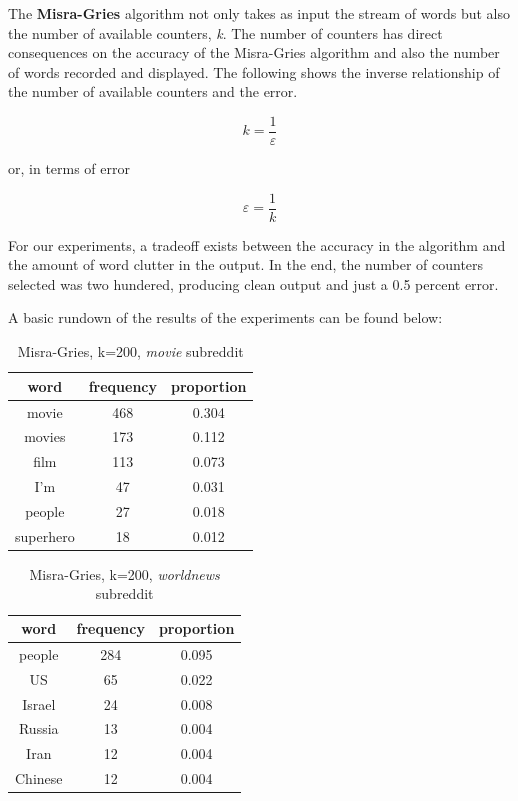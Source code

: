 \documentclass[12pt]{article}
\numberwithin{equation}{section}
\begin{document}
\raggedright

The \textbf{Misra-Gries} algorithm not only takes as input the stream of words but also the number of available counters, \textit{k}.  The number of counters has direct consequences on the accuracy of the Misra-Gries algorithm and also the number of words recorded and displayed.  The following shows the inverse relationship of the number of available counters and the error.    

\[k=\frac { 1 }{ \varepsilon  } \]  

or, in terms of error 

\[\varepsilon =\frac { 1 }{ k  } \]

For our experiments, a tradeoff exists between the accuracy in the algorithm and the amount of word clutter in the output.  In the end, the number of counters selected was two hundered, producing clean output and just a 0.5 percent error.

A basic rundown of the results of the experiments can be found below:

\begin{table}
\centering

\caption{Misra-Gries, k=200, \textit{movie} subreddit}
\begin{tabular}{c|c|c}
\hline
\textbf{word} & \textbf{frequency} & \textbf{proportion}\\
\hline
movie & 468 & 0.304\\
\hline
movies & 173 & 0.112\\
\hline
film & 113 & 0.073\\
\hline
I'm & 47 & 0.031\\
\hline
people & 27 & 0.018\\
\hline
superhero & 18 & 0.012\\
\hline
\end{tabular}
\end{table}

\begin{table}
\centering

\caption{Misra-Gries, k=200, \textit{worldnews} subreddit}
\begin{tabular}{c|c|c}
\hline
\textbf{word} & \textbf{frequency} & \textbf{proportion}\\
\hline
people & 284 & 0.095\\
\hline
US & 65 & 0.022\\
\hline
Israel & 24 & 0.008\\
\hline
Russia & 13 & 0.004\\
\hline
Iran & 12 & 0.004\\
\hline
Chinese & 12 & 0.004\\
\hline
\end{tabular}
\end{table}
\end{document}
